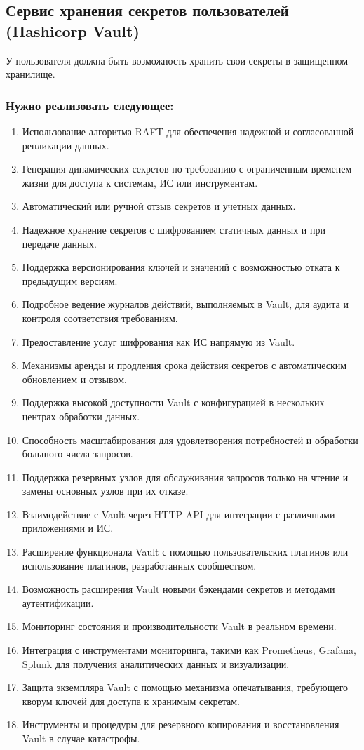 \documentclass[14pt, a4paper]{extarticle}
\begin{document}
\subsection{Сервис хранения секретов пользователей\\ (Hashicorp Vault)}

У пользователя должна быть возможность хранить свои секреты в защищенном хранилище.

\subsubsection*{Нужно реализовать следующее:}

\begin{enumerate}
\item Использование алгоритма RAFT для обеспечения надежной и согласованной репликации данных.
\item Генерация динамических секретов по требованию с ограниченным временем жизни для доступа к системам, ИС или инструментам.
\item Автоматический или ручной отзыв секретов и учетных данных.
\item Надежное хранение секретов с шифрованием статичных данных и при передаче данных.
\item Поддержка версионирования ключей и значений с возможностью отката к предыдущим версиям.
\item Подробное ведение журналов действий, выполняемых в Vault, для аудита и контроля соответствия требованиям.
\item Предоставление услуг шифрования как ИС напрямую из Vault.
\item Механизмы аренды и продления срока действия секретов с автоматическим обновлением и отзывом.
\item Поддержка высокой доступности Vault с конфигурацией в нескольких центрах обработки данных.
\item Способность масштабирования для удовлетворения потребностей и обработки большого числа запросов.
\item Поддержка резервных узлов для обслуживания запросов только на чтение и замены основных узлов при их отказе.
\item Взаимодействие с Vault через HTTP API для интеграции с различными приложениями и ИС.
\item Расширение функционала Vault с помощью пользовательских плагинов или использование плагинов, разработанных сообществом.
\item Возможность расширения Vault новыми бэкендами секретов и методами аутентификации.
\item Мониторинг состояния и производительности Vault в реальном времени.
\item Интеграция с инструментами мониторинга, такими как Prometheus, Grafana, Splunk для получения аналитических данных и визуализации.
\item Защита экземпляра Vault с помощью механизма опечатывания, требующего кворум ключей для доступа к хранимым секретам.
\item Инструменты и процедуры для резервного копирования и восстановления Vault в случае катастрофы.
\end{enumerate}
\end{document}
